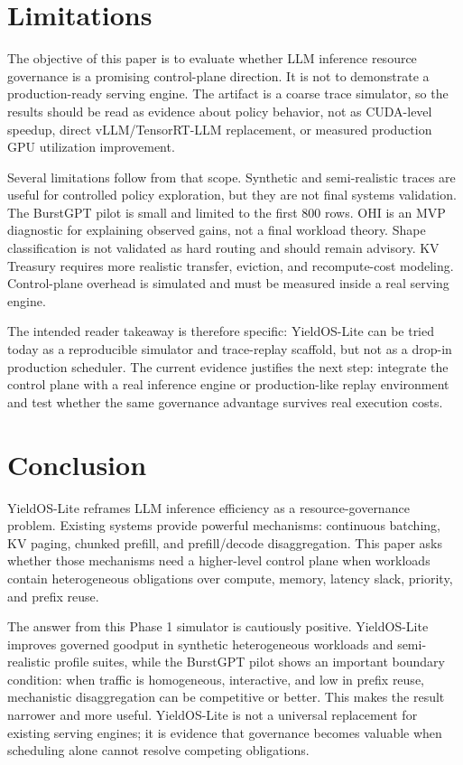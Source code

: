 \documentclass[11pt]{article}
\begin{document}
\section{Limitations}

The objective of this paper is to evaluate whether LLM inference resource governance is a promising control-plane direction. It is not to demonstrate a production-ready serving engine. The artifact is a coarse trace simulator, so the results should be read as evidence about policy behavior, not as CUDA-level speedup, direct vLLM/TensorRT-LLM replacement, or measured production GPU utilization improvement.

Several limitations follow from that scope. Synthetic and semi-realistic traces are useful for controlled policy exploration, but they are not final systems validation. The BurstGPT pilot is small and limited to the first 800 rows. OHI is an MVP diagnostic for explaining observed gains, not a final workload theory. Shape classification is not validated as hard routing and should remain advisory. KV Treasury requires more realistic transfer, eviction, and recompute-cost modeling. Control-plane overhead is simulated and must be measured inside a real serving engine.

The intended reader takeaway is therefore specific: YieldOS-Lite can be tried today as a reproducible simulator and trace-replay scaffold, but not as a drop-in production scheduler. The current evidence justifies the next step: integrate the control plane with a real inference engine or production-like replay environment and test whether the same governance advantage survives real execution costs.

\section{Conclusion}

YieldOS-Lite reframes LLM inference efficiency as a resource-governance problem. Existing systems provide powerful mechanisms: continuous batching, KV paging, chunked prefill, and prefill/decode disaggregation. This paper asks whether those mechanisms need a higher-level control plane when workloads contain heterogeneous obligations over compute, memory, latency slack, priority, and prefix reuse.

The answer from this Phase 1 simulator is cautiously positive. YieldOS-Lite improves governed goodput in synthetic heterogeneous workloads and semi-realistic profile suites, while the BurstGPT pilot shows an important boundary condition: when traffic is homogeneous, interactive, and low in prefix reuse, mechanistic disaggregation can be competitive or better. This makes the result narrower and more useful. YieldOS-Lite is not a universal replacement for existing serving engines; it is evidence that governance becomes valuable when scheduling alone cannot resolve competing obligations.
\end{document}
